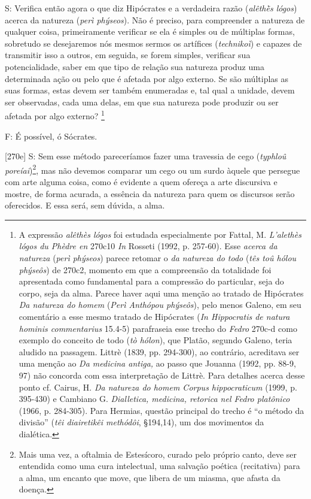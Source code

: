 S: Verifica então agora o que diz Hipócrates e a verdadeira razão
(\emph{alêthḕs lógos}) acerca da natureza (\emph{perì phýseos}). Não é
preciso, para compreender a natureza de qualquer coisa, primeiramente
verificar se ela é simples ou de múltiplas formas, sobretudo se
desejaremos nós mesmos sermos os artífices (\emph{technikoì}) e capazes
de transmitir isso a outros, em seguida, se forem simples, verificar sua
potencialidade, saber em que tipo de relação sua natureza produz uma
determinada ação ou pelo que é afetada por algo externo. Se são
múltiplas as suas formas, estas devem ser também enumeradas e, tal qual
a unidade, devem ser observadas, cada uma delas, em que sua natureza
pode produzir ou ser afetada por algo externo? \footnote{A expressão
  \emph{alêthès lógos} foi estudada especialmente por Fattal, M.
  \emph{L'alethès lógos du Phèdre en} 270c10 \emph{In} Rosseti (1992, p.
  257-60). Esse \emph{acerca da natureza} (\emph{perì phýseos}) parece
  retomar o \emph{da natureza do todo} (\emph{tês toû hólou phýseôs}) de
  270c2, momento em que a compreensão da totalidade foi apresentada como
  fundamental para a compressão do particular, seja do corpo, seja da
  alma. Parece haver aqui uma menção ao tratado de Hipócrates \emph{Da
  natureza do homem} (\emph{Perì Anthópou phýseôs}), pelo menos Galeno,
  em seu comentário a esse mesmo tratado de Hipócrates (\emph{In
  Hippocratis de natura hominis commentarius} 15.4-5) parafraseia esse
  trecho do \emph{Fedro} 270c-d como exemplo do conceito de todo
  (\emph{tò hólon}), que Platão, segundo Galeno, teria aludido na
  passagem. Littrè (1839, pp. 294-300), ao contrário, acreditava ser uma
  menção ao \emph{Da medicina antiga,} ao passo que Jouanna (1992, pp.
  88-9, 97) não concorda com essa interpretação de Littrè. Para detalhes
  acerca desse ponto cf. Cairus, H. \emph{Da natureza do homem Corpus
  hippocraticum} (1999, p. 395-430) e Cambiano G. \emph{Dialletica,
  medicina, retorica nel Fedro platônico} (1966, p. 284-305). Para
  Hermias, questão principal do trecho é ``o método da divisão''
  (\emph{têi diairetikêi methódôi}, §194,14), um dos movimentos da
  dialética.}

F: É possível, ó Sócrates.

{[}270e{]} S: Sem esse método pareceríamos fazer uma travessia de cego
(\emph{typhloû poreíai})\footnote{Mais uma vez, a oftalmia de
  Estesícoro, curado pelo próprio canto, deve ser entendida como uma
  cura intelectual, uma salvação poética (recitativa) para a alma, um
  encanto que move, que libera de um miasma, que afasta da doença.}, mas
não devemos comparar um cego ou um surdo àquele que persegue com arte
alguma coisa, como é evidente a quem ofereça a arte discursiva e mostre,
de forma acurada, a essência da natureza para quem os discursos serão
oferecidos. E essa será, sem dúvida, a alma.

